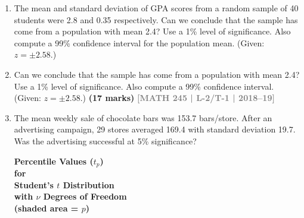 \documentclass[12pt,a4paper]{article}
\newcommand{\yr}[1]{\hfill\textcolor{gray}{\small\textbf{[#1]}}}
\newcommand{\mk}[1]{\textcolor{orange!70!black}{\small\textbf{(#1 marks)}}}
\begin{document}
\begin{enumerate}
\item The mean and standard deviation of GPA scores from a random sample of 40 students were 2.8 and 0.35 respectively. Can we conclude that the sample has come from a population with mean 2.4? Use a 1\% level of significance. Also compute a 99\% confidence interval for the population mean. (Given: $z=\pm2.58$.)


\item Can we conclude that the sample has come from a population with mean 2.4? Use a 1\% level of significance. Also compute a 99\% confidence interval. (Given: $z=\pm2.58$.)
\mk{17} \yr{MATH 245 | L-2/T-1 | 2018--19}

\item The mean weekly sale of chocolate bars was 153.7 bars/store. After an advertising campaign, 29 stores averaged 169.4 with standard deviation 19.7. Was the advertising successful at 5\% significance?


\begin{center}
\begin{minipage}{0.45\textwidth}
    \centering
    \textbf{\large Percentile Values ($t_p$)} \\
    \vspace{0.2cm}
    \textbf{for} \\
    \vspace{0.2cm}
    \textbf{Student's $t$ Distribution} \\
    \vspace{0.2cm}
    \textbf{with $\nu$ Degrees of Freedom} \\
    \vspace{0.2cm}
    \textbf{(shaded area = $p$)}
\end{minipage}
\hfill
\begin{minipage}{0.45\textwidth}
    \centering
\end{minipage}
\end{center}
\end{enumerate}
\end{document}
